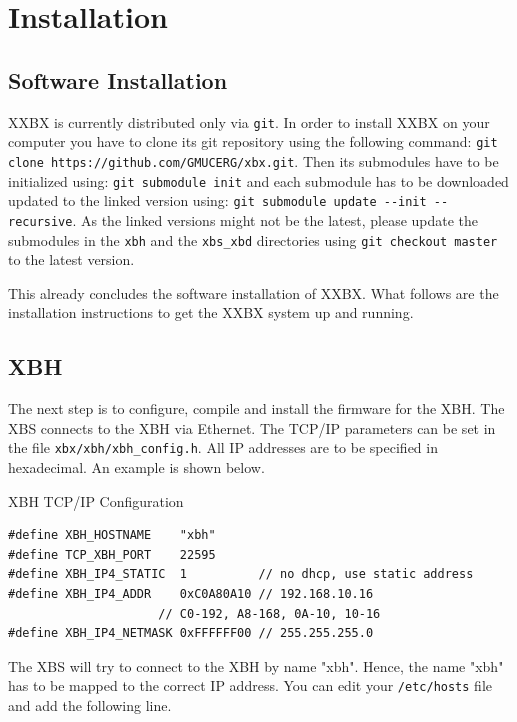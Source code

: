 \documentclass[twoside,11pt]{cergdoc}
\begin{document}
  \section{Installation}
    \subsection{Software Installation}

    XXBX is currently distributed only via \texttt{git}. In order to install XXBX on 
    your computer you have to clone its git repository using the following command:
    \verb|git clone https://github.com/GMUCERG/xbx.git|.
    Then its submodules have to be initialized using:
    \verb|git submodule init| and each submodule has to be downloaded updated to the linked
    version using: 
    \verb|git submodule update --init --recursive|.
    As the linked versions might not be the latest, please update the submodules in 
    the \verb|xbh| and the \verb|xbs_xbd| directories using 
    \verb|git checkout master| to the latest version. 

    This already concludes the software installation of XXBX. 
    What follows are the installation instructions to get the XXBX system up and 
    running. 

    \subsection{XBH}
The next step is to configure, compile and install the firmware for the XBH.
%
The XBS connects to the XBH via Ethernet. The TCP/IP parameters can be set
in the file \verb|xbx/xbh/xbh_config.h|. All IP addresses are to be specified
in hexadecimal. An example is shown below.

\begin{cergbox}{XBH TCP/IP Configuration}
\begin{lstlisting}
#define XBH_HOSTNAME    "xbh"
#define TCP_XBH_PORT    22595
#define XBH_IP4_STATIC  1          // no dhcp, use static address
#define XBH_IP4_ADDR    0xC0A80A10 // 192.168.10.16   
                     // C0-192, A8-168, 0A-10, 10-16
#define XBH_IP4_NETMASK 0xFFFFFF00 // 255.255.255.0
\end{lstlisting}
\end{cergbox}

The XBS will try to connect to the XBH by name "xbh". Hence, the name "xbh" has to 
be mapped to the correct IP address. You can edit your \verb|/etc/hosts| file
and add the following line.
\end{document}
